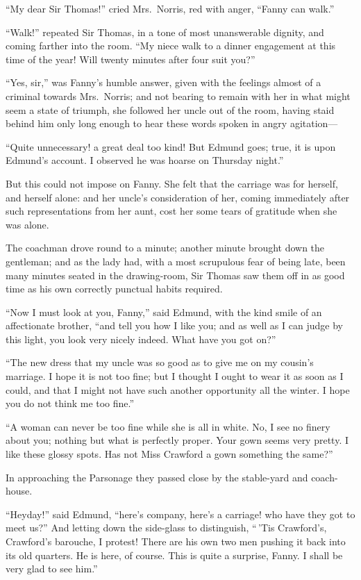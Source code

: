 \documentclass{article}
\begin{document}
``My dear Sir Thomas!'' cried Mrs.\ Norris, red with anger,
``Fanny can walk.''

``Walk!'' repeated Sir Thomas, in a tone of most unanswerable
dignity, and coming farther into the room.  ``My niece
walk to a dinner engagement at this time of the year!
Will twenty minutes after four suit you?''

``Yes, sir,'' was Fanny's humble answer, given with the
feelings almost of a criminal towards Mrs.\ Norris;
and not bearing to remain with her in what might seem
a state of triumph, she followed her uncle out of the room,
having staid behind him only long enough to hear these
words spoken in angry agitation---%

``Quite unnecessary! a great deal too kind!
But Edmund goes; true, it is upon Edmund's account.
I observed he was hoarse on Thursday night.''

But this could not impose on Fanny.  She felt that
the carriage was for herself, and herself alone:
and her uncle's consideration of her, coming immediately
after such representations from her aunt, cost her
some tears of gratitude when she was alone.

The coachman drove round to a minute; another minute
brought down the gentleman; and as the lady had, with a
most scrupulous fear of being late, been many minutes
seated in the drawing-room, Sir Thomas saw them off
in as good time as his own correctly punctual habits required.

``Now I must look at you, Fanny,'' said Edmund, with the
kind smile of an affectionate brother, ``and tell you
how I like you; and as well as I can judge by this light,
you look very nicely indeed.  What have you got on?''

``The new dress that my uncle was so good as to give me
on my cousin's marriage.  I hope it is not too fine; but I
thought I ought to wear it as soon as I could, and that I
might not have such another opportunity all the winter.
I hope you do not think me too fine.''

``A woman can never be too fine while she is all in white.  No, I
see
no finery about you; nothing but what is perfectly proper.
Your gown seems very pretty.  I like these glossy spots.
Has not Miss Crawford a gown something the same?''

In approaching the Parsonage they passed close by the
stable-yard and coach-house.

``Heyday!'' said Edmund, ``here's company, here's a carriage!
who have they got to meet us?''  And letting down the side-glass
to distinguish, ``\,'Tis Crawford's, Crawford's barouche,
I protest!  There are his own two men pushing it back
into its old quarters.  He is here, of course.  This is
quite a surprise, Fanny.  I shall be very glad to see him.''
\end{document}
